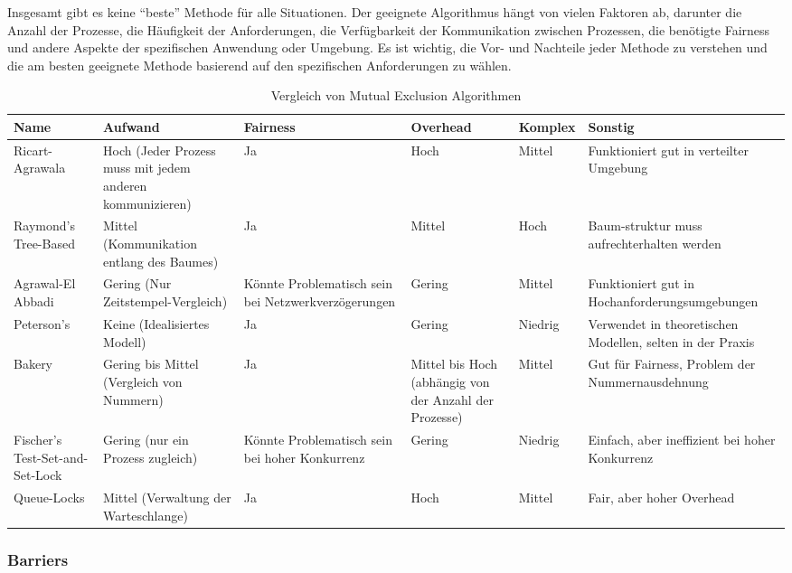 Insgesamt gibt es keine \enquote{beste} Methode für alle Situationen. Der geeignete Algorithmus hängt von vielen Faktoren ab, darunter die Anzahl der Prozesse, die Häufigkeit der Anforderungen, die Verfügbarkeit der Kommunikation zwischen Prozessen, die benötigte Fairness und andere Aspekte der spezifischen Anwendung oder Umgebung. Es ist wichtig, die Vor- und Nachteile jeder Methode zu verstehen und die am besten geeignete Methode basierend auf den spezifischen Anforderungen zu wählen.

\begin{table}
\centering
\begin{tabularx}{\textwidth}{|X|X|X|X|X|X|}
\hline
\textbf{Name} & \textbf{Aufwand} & \textbf{Fairness} & \textbf{Overhead} & \textbf{Komplex} & \textbf{Sonstig} \\ 
\hline
Ricart-Agrawala & Hoch (Jeder Prozess muss mit jedem anderen kommunizieren) & Ja & Hoch & Mittel & Funktioniert gut in verteilter Umgebung \\ 
\hline
Raymond's Tree-Based & Mittel (Kommunikation entlang des Baumes) & Ja & Mittel & Hoch & Baum-struktur muss aufrechterhalten werden \\ 
\hline
Agrawal-El Abbadi & Gering (Nur Zeitstempel-Vergleich) & Könnte Problematisch sein bei Netzwerkverzögerungen & Gering & Mittel & Funktioniert gut in Hochanforderungsumgebungen \\ 
\hline
Peterson's & Keine (Idealisiertes Modell) & Ja & Gering & Niedrig & Verwendet in theoretischen Modellen, selten in der Praxis \\ 
\hline
Bakery & Gering bis Mittel (Vergleich von Nummern) & Ja & Mittel bis Hoch (abhängig von der Anzahl der Prozesse) & Mittel & Gut für Fairness, Problem der Nummernausdehnung \\ 
\hline
Fischer's Test-Set-and-Set-Lock & Gering (nur ein Prozess zugleich) & Könnte Problematisch sein bei hoher Konkurrenz & Gering & Niedrig & Einfach, aber ineffizient bei hoher Konkurrenz \\ 
\hline
Queue-Locks & Mittel (Verwaltung der Warteschlange) & Ja & Hoch & Mittel & Fair, aber hoher Overhead \\ 
\hline
\end{tabularx}
\caption{Vergleich von Mutual Exclusion Algorithmen}
\end{table}


\subsubsection{Barriers}


